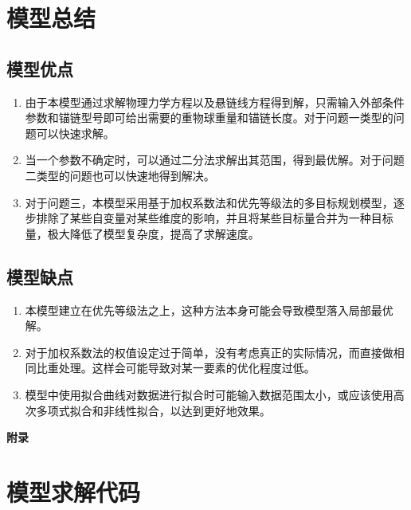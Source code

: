 \documentclass{cumcm}
\begin{document}
\section{模型总结}

\subsection{模型优点}

\begin{enumerate}

\item 由于本模型通过求解物理力学方程以及悬链线方程得到解，只需输入外部条件参数和锚链型号即可给出需要的重物球重量和锚链长度。对于问题一类型的问题可以快速求解。

\item 当一个参数不确定时，可以通过二分法求解出其范围，得到最优解。对于问题二类型的问题也可以快速地得到解决。

\item 对于问题三，本模型采用基于加权系数法和优先等级法的多目标规划模型，逐步排除了某些自变量对某些维度的影响，并且将某些目标量合并为一种目标量，极大降低了模型复杂度，提高了求解速度。

\end{enumerate}

\subsection{模型缺点}

\begin{enumerate}
\item 本模型建立在优先等级法之上，这种方法本身可能会导致模型落入局部最优解。
\item 对于加权系数法的权值设定过于简单，没有考虑真正的实际情况，而直接做相同比重处理。这样会可能导致对某一要素的优化程度过低。
\item 模型中使用拟合曲线对数据进行拟合时可能输入数据范围太小，或应该使用高次多项式拟合和非线性拟合，以达到更好地效果。
\end{enumerate}





\newpage
\appendix
\textbf{附录}
\section{模型求解代码}
\end{document}
